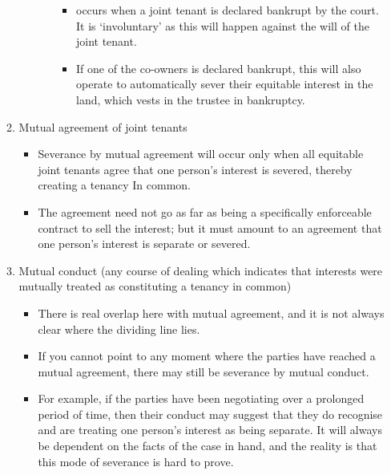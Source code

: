 \documentclass[
]{article}
\providecommand{\tightlist}{%
  \setlength{\itemsep}{0pt}\setlength{\parskip}{0pt}}
\begin{document}
\begin{enumerate}
\begin{enumerate}
\begin{itemize}
\begin{enumerate}
        \begin{itemize}
        \tightlist
        \item
          occurs when a joint tenant is declared bankrupt by the court.
          It is `involuntary' as this will happen against the will of
          the joint tenant.
        \item
          If one of the co-owners is declared bankrupt, this will also
          operate to automatically sever their equitable interest in the
          land, which vests in the trustee in bankruptcy.
        \end{itemize}
      \end{enumerate}
    \end{itemize}
  \item
    Mutual agreement of joint tenants

    \begin{itemize}
    \tightlist
    \item
      Severance by mutual agreement will occur only when all equitable
      joint tenants agree that one person's interest is severed, thereby
      creating a tenancy In common.
    \item
      The agreement need not go as far as being a specifically
      enforceable contract to sell the interest; but it must amount to
      an agreement that one person's interest is separate or severed.
    \end{itemize}
  \item
    Mutual conduct (any course of dealing which indicates that interests
    were mutually treated as constituting a tenancy in common)

    \begin{itemize}
    \tightlist
    \item
      There is real overlap here with mutual agreement, and it is not
      always clear where the dividing line lies.
    \item
      If you cannot point to any moment where the parties have reached a
      mutual agreement, there may still be severance by mutual conduct.
    \item
      For example, if the parties have been negotiating over a prolonged
      period of time, then their conduct may suggest that they do
      recognise and are treating one person's interest as being
      separate. It will always be dependent on the facts of the case in
      hand, and the reality is that this mode of severance is hard to
      prove.
    \end{itemize}
  \end{enumerate}
\end{enumerate}
\end{document}
